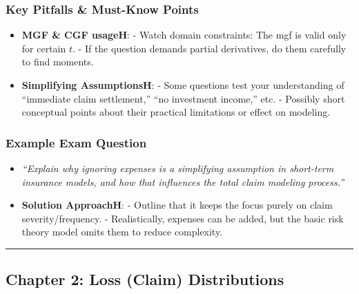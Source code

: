 \documentclass[13pt,a4paper]{article}
\begin{document}
\subsubsection{Key Pitfalls \& Must-Know Points}
\begin{itemize}
  \item \textbf{MGF \& CGF usageH}:
    - Watch domain constraints: The mgf is valid only for certain \(t\).  
    - If the question demands partial derivatives, do them carefully to find moments.
  \item \textbf{Simplifying AssumptionsH}:
    - Some questions test your understanding of “immediate claim settlement,” “no investment income,” etc. 
    - Possibly short conceptual points about their practical limitations or effect on modeling.
\end{itemize}

\subsubsection{Example Exam Question}
\begin{itemize}
  \item \emph{“Explain why ignoring expenses is a simplifying assumption in short-term insurance models, and how that influences the total claim modeling process.”}
  \item \textbf{Solution ApproachH}: 
    - Outline that it keeps the focus purely on claim severity/frequency.  
    - Realistically, expenses can be added, but the basic risk theory model omits them to reduce complexity.
\end{itemize}

\vspace{1em}
\hrule
\vspace{1em}

\subsection{Chapter 2: Loss (Claim) Distributions}
\end{document}
